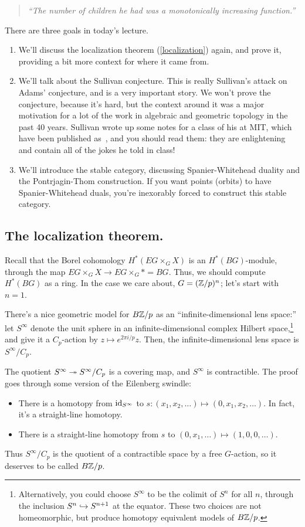 \begin{quote}\textit{
	``The number of children he had was a monotonically increasing function.''
}\end{quote}
There are three goals in today's lecture.
\begin{enumerate}
	\item We'll discuss the localization theorem (\cref{localization}) again, and prove it, providing a bit more
	context for where it came from.
	\item We'll talk about the Sullivan conjecture. This is really Sullivan's attack on Adams' conjecture, and is a
	very important story. We won't prove the conjecture, because it's hard, but the context around it was a major
	motivation for a lot of the work in algebraic and geometric topology in the past 40 years. Sullivan wrote up
	some notes for a class of his at MIT, which have been published as~\cite{MITNotes}, and you should read them:
	they are enlightening and contain all of the jokes he told in class!
	\item We'll introduce the stable category, discussing Spanier-Whitehead duality and the Pontrjagin-Thom
	construction. If you want points (orbits) to have Spanier-Whitehead duals, you're inexorably forced to
	construct this stable category.
\end{enumerate}
\subsection*{The localization theorem.}
Recall that the Borel cohomology $H^*(EG\times_G X)$ is an $H^*(BG)$-module, through the map $EG\times_G X\to
EG\times_G * = BG$. Thus, we should compute $H^*(BG)$ as a ring. In the case we care about, $G = (\mathbb Z/p)^n$; let's
start with $n = 1$.

There's a nice geometric model for $B\mathbb Z/p$ as an ``infinite-dimensional lens space:'' let $S^\infty$ denote the
unit sphere in an infinite-dimensional complex Hilbert space,\footnote{Alternatively, you could choose $S^\infty$
to be the colimit of $S^n$ for all $n$, through the inclusion $S^n\hookrightarrow S^{n+1}$ at the equator. These two choices
are not homeomorphic, but produce homotopy equivalent models of $B\mathbb Z/p$.} and give it a $C_p$-action by $z\mapsto
e^{2\pi i/p}z$. Then, the infinite-dimensional lens space is $S^\infty/C_p$.

The quotient $S^\infty\twoheadrightarrow S^\infty/C_p$ is a covering map, and $S^\infty$ is contractible. The proof goes through
some version of the Eilenberg swindle:
\begin{itemize}
	\item There is a homotopy from $\mathrm{id}_{S^\infty}$ to $s: (x_1,x_2,\dotsc)\mapsto (0, x_1, x_2, \dotsc)$. In fact,
	it's a straight-line homotopy.
	\item There is a straight-line homotopy from $s$ to $(0,x_1,\dotsc)\mapsto (1, 0, 0,\dotsc)$.
\end{itemize}
Thus $S^\infty/C_p$ is the quotient of a contractible space by a free $G$-action, so it deserves to be called
$B\mathbb Z/p$.

